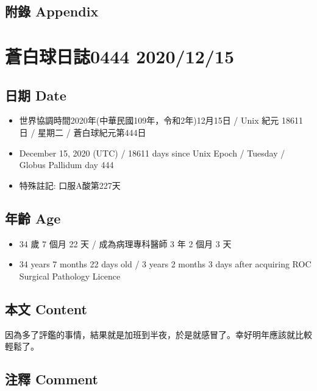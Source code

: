 \documentclass[
]{article}
\providecommand{\tightlist}{%
  \setlength{\itemsep}{0pt}\setlength{\parskip}{0pt}}
\begin{document}
\hypertarget{ux9644ux9304-appendix-13}{%
\subsection{附錄 Appendix}\label{ux9644ux9304-appendix-13}}

\hypertarget{ux84bcux767dux7403ux65e5ux8a8c0444-20201215}{%
\section{蒼白球日誌0444
2020/12/15}\label{ux84bcux767dux7403ux65e5ux8a8c0444-20201215}}

\hypertarget{ux65e5ux671f-date-14}{%
\subsection{日期 Date}\label{ux65e5ux671f-date-14}}

\begin{itemize}
\tightlist
\item
  世界協調時間2020年(中華民國109年，令和2年)12月15日 / Unix 紀元 18611
  日 / 星期二 / 蒼白球紀元第444日
\item
  December 15, 2020 (UTC) / 18611 days since Unix Epoch / Tuesday /
  Globus Pallidum day 444
\item
  特殊註記: 口服A酸第227天
\end{itemize}

\hypertarget{ux5e74ux9f61-age-14}{%
\subsection{年齡 Age}\label{ux5e74ux9f61-age-14}}

\begin{itemize}
\tightlist
\item
  34 歲 7 個月 22 天 / 成為病理專科醫師 3 年 2 個月 3 天
\item
  34 years 7 months 22 days old / 3 years 2 months 3 days after
  acquiring ROC Surgical Pathology Licence
\end{itemize}

\hypertarget{ux672cux6587-content-14}{%
\subsection{本文 Content}\label{ux672cux6587-content-14}}

因為多了評鑑的事情，結果就是加班到半夜，於是就感冒了。幸好明年應該就比較輕鬆了。

\hypertarget{ux6ce8ux91cb-comment-14}{%
\subsection{注釋 Comment}\label{ux6ce8ux91cb-comment-14}}
\end{document}
